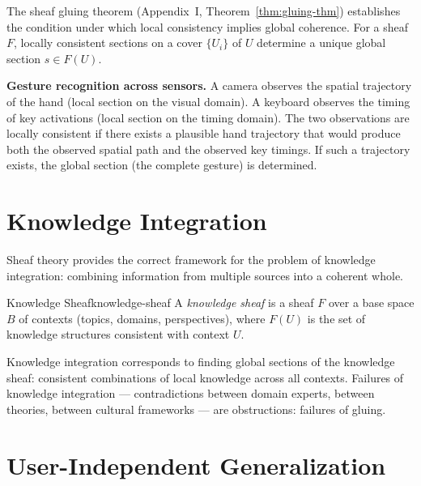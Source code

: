 The sheaf gluing theorem (Appendix~I, Theorem~\ref{thm:gluing-thm})
establishes the condition under which local consistency implies global
coherence. For a sheaf $F$, locally consistent sections on a cover
$\{U_i\}$ of $U$ determine a unique global section $s \in F(U)$.

\begin{example}
  \textbf{Gesture recognition across sensors.} A camera observes the
  spatial trajectory of the hand (local section on the visual domain).
  A keyboard observes the timing of key activations (local section on
  the timing domain). The two observations are locally consistent if
  there exists a plausible hand trajectory that would produce both
  the observed spatial path and the observed key timings. If such a
  trajectory exists, the global section (the complete gesture) is
  determined.
\end{example}

\section{Knowledge Integration}

Sheaf theory provides the correct framework for the problem of knowledge
integration: combining information from multiple sources into a coherent
whole.

\begin{definition}{Knowledge Sheaf}{knowledge-sheaf}
  A \emph{knowledge sheaf} is a sheaf $F$ over a base space $B$ of
  contexts (topics, domains, perspectives), where $F(U)$ is the set
  of knowledge structures consistent with context $U$.
\end{definition}

Knowledge integration corresponds to finding global sections of the
knowledge sheaf: consistent combinations of local knowledge across all
contexts. Failures of knowledge integration — contradictions between
domain experts, between theories, between cultural frameworks — are
obstructions: failures of gluing.

\section{User-Independent Generalization}

